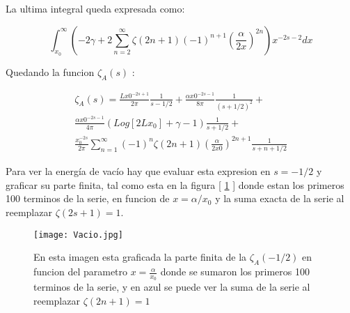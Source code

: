 La ultima integral queda expresada como:

\begin{equation}
\int _{x_0} ^{\infty}
\left(
-2 \gamma + 
2 \sum _{n=2} ^{\infty}
\zeta (2n+1) (-1) ^{n+1}
( \frac{\alpha}{2 x} ) ^{2n}
\right)
x ^{-2s-2} dx
\end{equation}

Quedando la funcion $\zeta _A (s) $ :

\begin{equation}
\begin{array}{c}
\zeta _A (s) = 
\frac{L x0 ^{-2s+1} }{2 \pi } \frac{1}{s- 1/2} + 
\frac{\alpha x0 ^{-2s-1} }{8 \pi } \frac{1}{(s+1/2) ^2} + \\
\frac{\alpha x0 ^{-2s-1} }{4 \pi } 
\left(
Log[2 L x_0] + \gamma - 1
\right)
\frac{1}{s+1/2} + \\
\frac{x_0 ^{-2s}}{2\pi} 
\sum _{n=1} ^{\infty} (-1) ^{n} \zeta (2n+1) 
( \frac{\alpha}{2 x0} ) ^{2n+1} \frac{1}{s+n+1/2}
\end{array}
\end{equation}

Para ver la energía de vacío hay que evaluar esta expresion en $s=-1/2$ y graficar su parte finita, tal como esta en la figura [ \ref{fig:vacio} ] donde estan los primeros 100 terminos de la serie, en funcion de $x = \alpha / x_0$ y la suma exacta de la serie al reemplazar $\zeta (2s+1) = 1$.

\begin{figure}
    \centering
    \texttt{[image: Vacio.jpg]}
    \caption{En esta imagen esta graficada la parte finita de la $\zeta _A (-1/2) $ en funcion del parametro $x= \frac{\alpha}{x _0}$ donde se sumaron los primeros 100 terminos de la serie, y en azul se puede ver la suma de la serie al reemplazar $\zeta (2n+1) = 1$}
    \label{fig:vacio}
\end{figure}